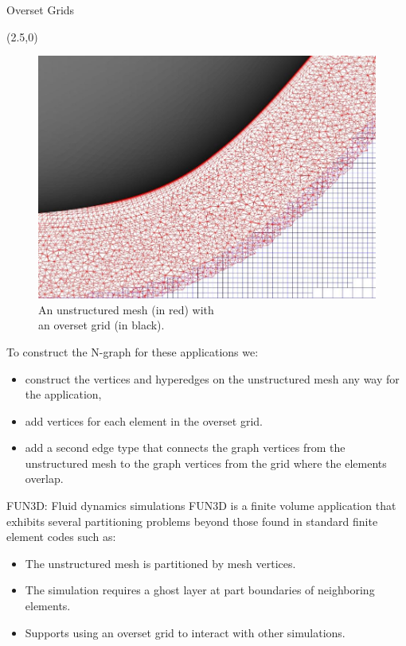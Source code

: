 \documentclass{beamer}
\begin{document}
\begin{textblock}{15.6}
\begin{textblock}{5}
\begin{block}{Overset Grids}
\begin{textblock}{2.7}
        

      \end{textblock}
      \begin{textblock}{2.5}(2.5,0)
        \begin{figure}
          \centering
          \includegraphics[height=.6\textwidth]{../figures/overset_grid.jpg}
          \caption{An unstructured mesh (in red) with \\an overset grid (in black).}
        \end{figure}
      \end{textblock}
      \vspace{14cm}

      
      To construct the N-graph for these applications we:
      \begin{itemize}
      \item construct the vertices and hyperedges on the unstructured mesh any way for the application,
      \item add vertices for each element in the overset grid.
      \item add a second edge type that connects the graph vertices from the unstructured mesh to the graph vertices from the grid where the elements overlap.
      \end{itemize}

      
    \end{block}
    
    \begin{block}{FUN3D: Fluid dynamics simulations}
      FUN3D is a finite volume application that exhibits several partitioning problems beyond those found in standard finite element codes such as:
      \begin{itemize}
      \item The unstructured mesh is partitioned by mesh vertices.
      \item The simulation requires a ghost layer at part boundaries of neighboring elements.
      \item Supports using an overset grid to interact with other simulations.
      \end{itemize}


\end{block}
\end{textblock}
\end{textblock}
\end{document}
